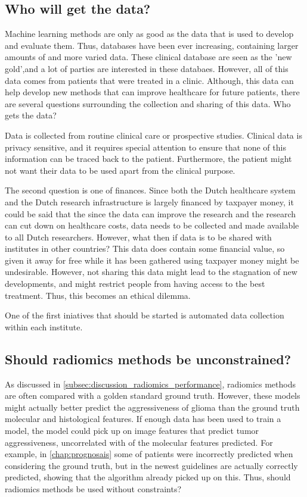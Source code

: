 \subsection{Who will get the data?}

Machine learning methods are only as good as the data that is used to develop and evaluate them.
Thus, databases have been ever increasing, containing larger amounts of and more varied data.
These clinical database are seen as the 'new gold',and a lot of parties are interested in these databaes.
However, all of this data comes from patients that were treated in a clinic.
Although, this data can help develop new methods that can improve healthcare for future patients, there are several questions surrounding the collection and sharing of this data.
Who gets the data?

Data is collected from routine clinical care or prospective studies.
Clinical data is privacy sensitive, and it requires special attention to ensure that none of this information can be traced back to the patient.
Furthermore, the patient might not want their data to be used apart from the clinical purpose.

The second question is one of finances.
Since both the Dutch healthcare system and the Dutch research infrastructure is largely financed by taxpayer money, it could be said that the since the data can improve the research and the research can cut down on healthcare costs, data needs to be collected and made available to all Dutch researchers.
However, what then if data is to be shared with institutes in other countries?
This data does contain some financial value, so given it away for free while it has been gathered using taxpayer money might be undesirable.
However, not sharing this data might lead to the stagnation of new developments, and might restrict people from having access to the best treatment.
Thus, this becomes an ethical dilemma.

One of the first iniatives that should be started is automated data collection within each institute.


\subsection{Should radiomics methods be unconstrained?}

As discussed in \cref{subsec:discussion_radiomics_performance}, radiomics methods are often compared with a golden standard ground truth.
However, these models might actually better predict the aggressiveness of \gls{glioma} than the ground truth molecular and histological features.
If enough data has been used to train a model, the model could pick up on image features that predict \gls{tumor} aggressiveness, uncorrelated with of the molecular features predicted.
For example, in \cref{chap:prognosais} some of patients were incorrectly predicted when considering the ground truth, but in the newest guidelines are actually correctly predicted, showing that the algorithm already picked up on this.
Thus, should radiomics methods be used without constraints?

